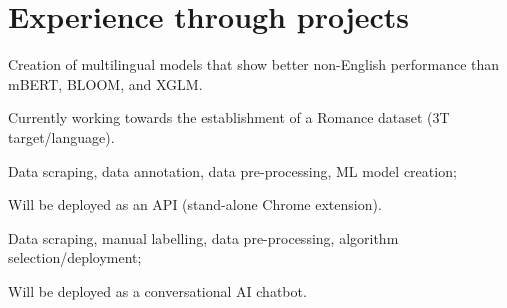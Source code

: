 \documentclass[]{plushcv}
\begin{document}
\begin{minipage}[t]{0.70\textwidth}



\section{Experience through projects}

\begin{tightemize}
\item Creation of multilingual models that show better non-English performance than mBERT, BLOOM, and XGLM.
\item Currently working towards the establishment of a Romance dataset (3T target/language). 
\end{tightemize}
\sectionsep

\begin{tightemize}
\item Data scraping, data annotation, data pre-processing, ML model creation;
\item Will be deployed as an API (stand-alone Chrome extension).
\end{tightemize}
\sectionsep

\begin{tightemize}
\item Data scraping, manual labelling, data pre-processing, algorithm selection/deployment;
\item Will be deployed as a conversational AI chatbot.
\end{tightemize}
\sectionsep


\end{minipage}
\end{document}
